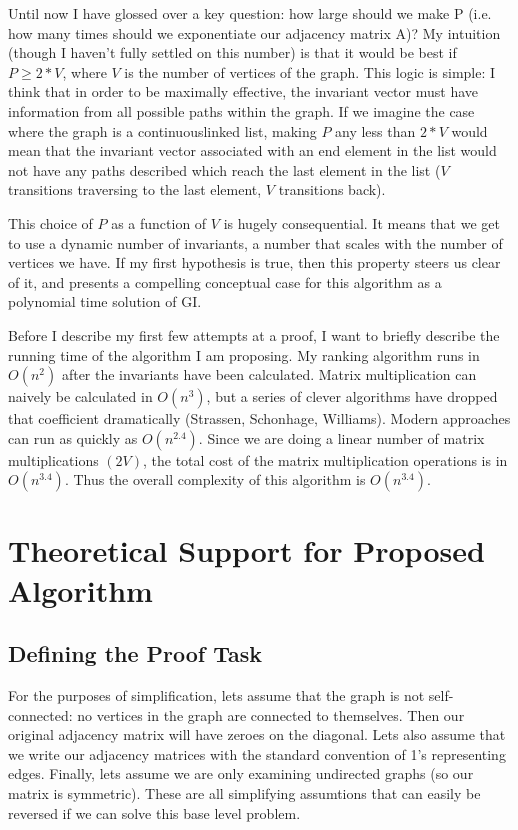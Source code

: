 \documentclass[a4paper,12pt]{article}
\begin{document}
Until now I have glossed over a key question: how large should we make P (i.e. how many times should we exponentiate our adjacency matrix A)?
My intuition (though I haven't fully settled on this number) is that it would be best if \(P \geq 2 * V\), where \(V\) is the number of vertices of the graph.
This logic is simple: I think that in order to be maximally effective, the invariant vector must
have information from all possible paths within the graph.  If we imagine the case where the
graph is a continuouslinked list, making \(P\) any less than \(2 * V\) would mean that the invariant
vector associated with an end element in the list would not have any paths described which reach the
last element in the list (\(V\) transitions traversing to the last element, \(V\) transitions back).


This choice of \(P\) as a function of \(V\) is hugely consequential.  It means that we get to use a dynamic number
of invariants, a number that scales with the number of vertices we have. If my first hypothesis
is true, then this property steers us clear of it, and presents a compelling conceptual case for this algorithm as a polynomial time solution of GI.


Before I describe my first few attempts at a proof, I want to briefly describe the running
time of the algorithm I am proposing.  My ranking algorithm runs in \(O(n^2)\) after the invariants have been
calculated. Matrix multiplication can naively be calculated in \(O(n^3)\), but a series of clever
algorithms have dropped that coefficient dramatically (Strassen, Schonhage, Williams). Modern
approaches can run as quickly as \(O(n^{2.4})\). Since we are doing a linear number of matrix multiplications \((2V)\),
the total cost of the matrix multiplication operations is in  \(O(n^{3.4})\). Thus the overall complexity of this
algorithm is \(O(n^{3.4})\).

\section*{Theoretical Support for Proposed Algorithm}

\subsection*{Defining the Proof Task}

For the purposes of simplification, lets assume that the graph is not self-connected: no
vertices in the graph are connected to themselves. Then our original adjacency matrix will
have zeroes on the diagonal.  Lets also assume that we write our adjacency 
matrices with the standard convention of 1's representing edges. Finally, lets assume we are
only examining undirected graphs (so our matrix is symmetric). These are all simplifying assumtions
that can easily be reversed if we can solve this base level problem.
\end{document}
